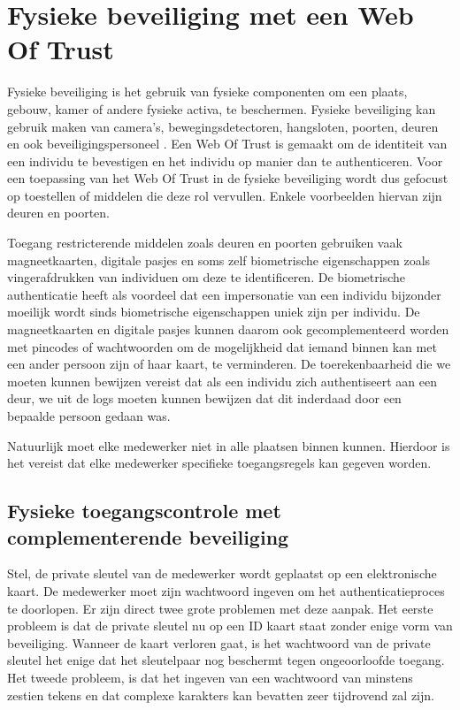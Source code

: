 \chapter{Fysieke beveiliging met een Web Of Trust}
\label{ch:fysieke-beveiliging-met-een-wot}

Fysieke beveiliging is het gebruik van fysieke componenten om een plaats,
gebouw, kamer of andere fysieke activa, te beschermen. Fysieke beveiliging kan
gebruik maken van camera’s, bewegingsdetectoren, hangsloten, poorten, deuren en
ook beveiligingspersoneel \autocite{FennellyPhysicalSecurity}. Een Web Of Trust
is gemaakt om de identiteit van een individu te bevestigen en het individu op
manier dan te authenticeren. Voor een toepassing van het Web Of Trust in de
fysieke beveiliging wordt dus gefocust op toestellen of middelen die deze rol
vervullen. Enkele voorbeelden hiervan zijn deuren en poorten.

Toegang restricterende middelen zoals deuren en poorten gebruiken vaak
magneetkaarten, digitale pasjes en soms zelf biometrische eigenschappen zoals
vingerafdrukken van individuen om deze te identificeren. De biometrische
authenticatie heeft als voordeel dat een impersonatie van een individu bijzonder
moeilijk wordt sinds biometrische eigenschappen uniek zijn per individu. De
magneetkaarten en digitale pasjes kunnen daarom ook gecomplementeerd worden met
pincodes of wachtwoorden om de mogelijkheid dat iemand binnen kan met een ander
persoon zijn of haar kaart, te verminderen. De \gls{toerekenbaarheid} die we
moeten
kunnen bewijzen vereist dat als een individu zich authentiseert aan een deur, we
uit de logs moeten kunnen bewijzen dat dit inderdaad door een bepaalde persoon
gedaan was.

Natuurlijk moet elke medewerker niet in alle plaatsen binnen kunnen. Hierdoor is
het vereist dat elke medewerker specifieke toegangsregels kan gegeven worden.

\section{Fysieke toegangscontrole met complementerende beveiliging}
\label{sec:fysieke-toegangscontrole-met-complementerende-beveiliging}

Stel, de private sleutel van de medewerker wordt geplaatst op een elektronische
kaart. De medewerker moet zijn wachtwoord ingeven om het authenticatieproces te
doorlopen. Er zijn direct twee grote problemen met deze aanpak. Het eerste
probleem is dat de private sleutel nu op een ID kaart staat zonder enige vorm
van beveiliging. Wanneer de kaart verloren gaat, is het wachtwoord van de
private sleutel het enige dat het sleutelpaar nog beschermt tegen ongeoorloofde
toegang. Het tweede probleem, is dat het ingeven van een wachtwoord van minstens
zestien tekens en dat complexe karakters kan bevatten zeer tijdrovend zal zijn.

